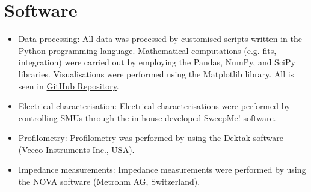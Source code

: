 \section{Software}
\begin{itemize}
\item Data processing: All data was processed by customised scripts written in the Python programming language. Mathematical computations (e.g. fits, integration) were carried out by employing the Pandas, NumPy, and SciPy libraries. Visualisations were performed using the Matplotlib library. All is seen in \href{https://github.com/marivelascoe25/Thesis.git}{GitHub Repository}.
\item Electrical characterisation: Electrical characterisations were performed by controlling SMUs through the in-house developed \href{https://sweep-me.net/}{SweepMe! software}. 
\item Profilometry: Profilometry was performed by using the Dektak software (Veeco Instruments Inc., USA).
\item Impedance measurements: Impedance measurements were performed by using the NOVA software (Metrohm AG, Switzerland).
\end{itemize}


